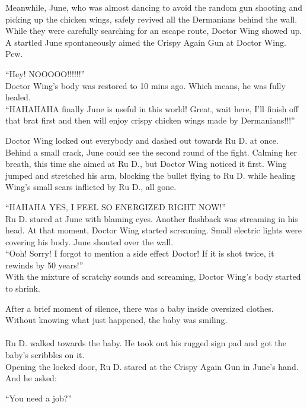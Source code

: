 Meanwhile, June, who was almost dancing to avoid the random gun shooting and picking up the chicken wings, safely revived all the Dermanians behind the wall. While they were carefully searching for an escape route, Doctor Wing showed up. A startled June spontaneously aimed the Crispy Again Gun at Doctor Wing. Pew.

``Hey! NOOOOO!!!!!!'' \\
Doctor Wing's body was restored to 10 mins ago. Which means, he was fully healed. \\
``HAHAHAHA finally June is useful in this world! Great, wait here, I'll finish off that brat first and then will enjoy crispy chicken wings made by Dermanians!!!''

Doctor Wing locked out everybody and dashed out towards Ru D. at once. Behind a small crack, June could see the second round of the fight. Calming her breath, this time she aimed at Ru D., but Doctor Wing noticed it first. Wing jumped and stretched his arm, blocking the bullet flying to Ru D. while healing Wing's small scars inflicted by Ru D., all gone.

``HAHAHA YES, I FEEL SO ENERGIZED RIGHT NOW!'' \\
Ru D. stared at June with blaming eyes. Another flashback was streaming in his head. At that moment, Doctor Wing started screaming. Small electric lights were covering his body. June shouted over the wall. \\
``Ooh! Sorry! I forgot to mention a side effect Doctor! If it is shot twice, it rewinds by 50 years!'' \\
With the mixture of scratchy sounds and screaming, Doctor Wing's body started to shrink.
 
After a brief moment of silence, there was a baby inside oversized clothes. Without knowing what just happened, the baby was smiling. \\ \\
Ru D. walked towards the baby. He took out his rugged sign pad and got the baby's scribbles on it. \\
Opening the locked door, Ru D. stared at the Crispy Again Gun in June's hand. And he asked:

``You need a job?''